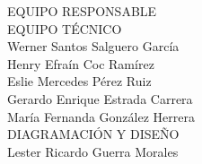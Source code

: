 {\Bold \LARGE EQUIPO RESPONSABLE}\\[2cm]
{\Bold \large \color{color1!89!black} EQUIPO TÉCNICO}\\[0.2cm]
Werner Santos Salguero García\\
Henry Efraín Coc Ramírez\\
Eslie Mercedes Pérez Ruiz \\
Gerardo Enrique Estrada Carrera\\
María Fernanda González Herrera\\[0.8cm]
{\Bold \large \color{color1!89!black} DIAGRAMACIÓN Y DISEÑO}\\[0.2cm]
Lester Ricardo Guerra Morales
